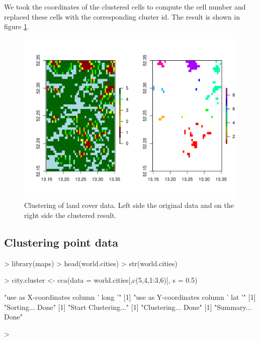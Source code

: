 \documentclass[10pt,a4paper]{article}
\begin{document}
We took the coordinates of the clustered cells to compute the cell number and replaced these cells with the corresponding cluster id. The result is shown in figure \ref{fig:landcover}.


\begin{figure}
\centering
\includegraphics[width=\textwidth]{pics/landcover.pdf}
\caption{Clustering of land cover data. Left side the original data and on the right side the clustered result.}
\label{fig:landcover}
\end{figure}

\subsection{Clustering point data}

\begin{Schunk}
\begin{Sinput}
> library(maps)
> head(world.cities)
> str(world.cities)
\end{Sinput}
\end{Schunk}

\begin{Schunk}
\begin{Sinput}
> city.cluster <- cca(data = world.cities[,c(5,4,1:3,6)], s = 0.5)
\end{Sinput}
\begin{Soutput}
[1] "use as X-coordinates column ' long '"
[1] "use as Y-coordinates column ' lat '"
[1] "Sorting... Done"
[1] "Start Clustering..."
[1] "Clustering... Done"
[1] "Summary... Done"
\end{Soutput}
\begin{Sinput}
> 
\end{Sinput}
\end{Schunk}
\end{document}

